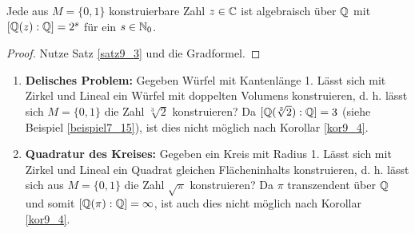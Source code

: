 \begin{kor}\label{kor9_4}
	Jede aus $M = \{0,1\}$ konstruierbare Zahl $z \in \mathbb{C}$ ist algebraisch über $\mathbb{Q}$ mit $[\mathbb{Q}(z) : \mathbb{Q}] = 2^s$ für ein $s \in \mathbb{N}_0$.
\end{kor}
\begin{proof}
	Nutze Satz \ref{satz9_3} und die Gradformel.
\end{proof}
\begin{beispiel}\label{beispiel9_5}
	\begin{enumerate}[label=(\arabic*)]
		\item \textbf{Delisches Problem:} Gegeben Würfel mit Kantenlänge 1. Lässt sich mit Zirkel und Lineal ein Würfel mit doppelten Volumens konstruieren, d. h. lässt sich $M = \{0,1\}$ die Zahl $\sqrt[3]{2}$ konstruieren? Da $[\mathbb{Q}(\sqrt[3]{2}) : \mathbb{Q}] = 3$ (siehe Beispiel \ref{beispiel7_15}), ist dies nicht möglich nach Korollar \ref{kor9_4}.
		\item \textbf{Quadratur des Kreises:} Gegeben ein Kreis mit Radius 1. Lässt sich mit Zirkel und Lineal ein Quadrat gleichen Flächeninhalts konstruieren, d. h. lässt sich aus $M = \{0,1\}$ die Zahl $\sqrt{\pi}$ konstruieren? Da $\pi$ transzendent über $\mathbb{Q}$ und somit $[\mathbb{Q}(\pi) : \mathbb{Q}] = \infty$, ist auch dies nicht möglich nach Korollar \ref{kor9_4}.
	\end{enumerate}
\end{beispiel}